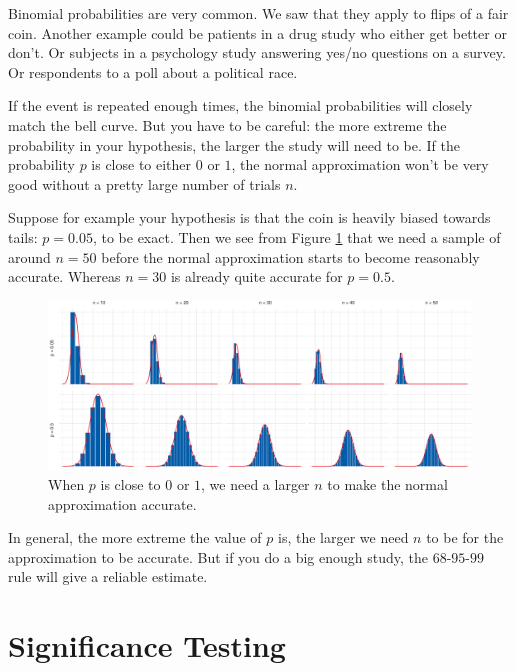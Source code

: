 \documentclass[justified]{tufte-book}
\theoremstyle{definition}
\theoremstyle{definition}
\theoremstyle{definition}
\theoremstyle{remark}
\begin{document}
Binomial probabilities are very common. We saw that they apply to flips of a fair coin. Another example could be patients in a drug study who either get better or don't. Or subjects in a psychology study answering yes/no questions on a survey. Or respondents to a poll about a political race.

If the event is repeated enough times, the binomial probabilities will closely match the bell curve. But you have to be careful: the more extreme the probability in your hypothesis, the larger the study will need to be. If the probability \(p\) is close to either \(0\) or \(1\), the normal approximation won't be very good without a pretty large number of trials \(n\).

Suppose for example your hypothesis is that the coin is heavily biased towards tails: \(p = 0.05\), to be exact. Then we see from Figure \ref{fig:npgrid} that we need a sample of around \(n = 50\) before the normal approximation starts to become reasonably accurate. Whereas \(n = 30\) is already quite accurate for \(p = 0.5\).

\begin{figure}
\includegraphics{_main_files/figure-latex/npgrid-1} \caption[When $p$ is close to $0$ or $1$, we need a larger $n$ to make the normal approximation accurate]{When $p$ is close to $0$ or $1$, we need a larger $n$ to make the normal approximation accurate.}\label{fig:npgrid}
\end{figure}

In general, the more extreme the value of \(p\) is, the larger we need \(n\) to be for the approximation to be accurate. But if you do a big enough study, the \(68\)-\(95\)-\(99\) rule will give a reliable estimate.

\hypertarget{significance-testing-1}{%
\section{Significance Testing}\label{significance-testing-1}}
\end{document}
